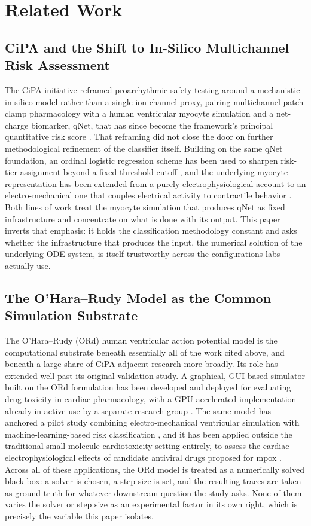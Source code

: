 \documentclass[journal]{IEEEtran}
\begin{document}
\section{Related Work}

\subsection{CiPA and the Shift to In-Silico Multichannel Risk Assessment}

The CiPA initiative reframed proarrhythmic safety testing around a mechanistic in-silico model rather than a single ion-channel proxy, pairing multichannel patch-clamp pharmacology with a human ventricular myocyte simulation and a net-charge biomarker, qNet, that has since become the framework's principal quantitative risk score \cite{li2017}. That reframing did not close the door on further methodological refinement of the classifier itself. Building on the same qNet foundation, an ordinal logistic regression scheme has been used to sharpen risk-tier assignment beyond a fixed-threshold cutoff \cite{kamanditya2024}, and the underlying myocyte representation has been extended from a purely electrophysiological account to an electro-mechanical one that couples electrical activity to contractile behavior \cite{heikhmakhtiar2026}. Both lines of work treat the myocyte simulation that produces qNet as fixed infrastructure and concentrate on what is done with its output. This paper inverts that emphasis: it holds the classification methodology constant and asks whether the infrastructure that produces the input, the numerical solution of the underlying ODE system, is itself trustworthy across the configurations labs actually use.

\subsection{The O'Hara--Rudy Model as the Common Simulation Substrate}

The O'Hara--Rudy (ORd) human ventricular action potential model \cite{ohara2011} is the computational substrate beneath essentially all of the work cited above, and beneath a large share of CiPA-adjacent research more broadly. Its role has extended well past its original validation study. A graphical, GUI-based simulator built on the ORd formulation has been developed and deployed for evaluating drug toxicity in cardiac pharmacology, with a GPU-accelerated implementation already in active use by a separate research group \cite{aroli2024}. The same model has anchored a pilot study combining electro-mechanical ventricular simulation with machine-learning-based risk classification \cite{fuadah2024}, and it has been applied outside the traditional small-molecule cardiotoxicity setting entirely, to assess the cardiac electrophysiological effects of candidate antiviral drugs proposed for mpox \cite{qauli2025}. Across all of these applications, the ORd model is treated as a numerically solved black box: a solver is chosen, a step size is set, and the resulting traces are taken as ground truth for whatever downstream question the study asks. None of them varies the solver or step size as an experimental factor in its own right, which is precisely the variable this paper isolates.
\end{document}
